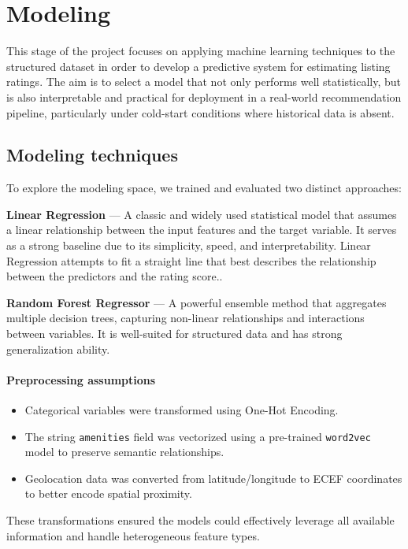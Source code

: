 \section{Modeling}\label{chap:modeling}

This stage of the project focuses on applying machine learning techniques to the structured dataset in order to develop a predictive system for estimating listing ratings. The aim is to select a model that not only performs well statistically, but is also interpretable and practical for deployment in a real-world recommendation pipeline, particularly under cold-start conditions where historical data is absent.

\subsection{Modeling techniques}
To explore the modeling space, we trained and evaluated two distinct approaches:

\textbf{Linear Regression } --- A classic and widely used statistical model that assumes a linear relationship between the input features and the target variable. It serves as a strong baseline due to its simplicity, speed, and interpretability. Linear Regression attempts to fit a straight line that best describes the relationship between the predictors and the rating score..

\textbf{Random Forest Regressor } --- A powerful ensemble method that aggregates multiple decision trees, capturing non-linear relationships and interactions between variables. It is well-suited for structured data and has strong generalization ability.

\paragraph{Preprocessing assumptions}
\begin{itemize}
  \item Categorical variables were transformed using One-Hot Encoding.
  \item The string \texttt{amenities} field was vectorized using a pre-trained \texttt{word2vec} model to preserve semantic relationships.
  \item Geolocation data was converted from latitude/longitude to ECEF coordinates to better encode spatial proximity.
\end{itemize}

These transformations ensured the models could effectively leverage all available information and handle heterogeneous feature types.

